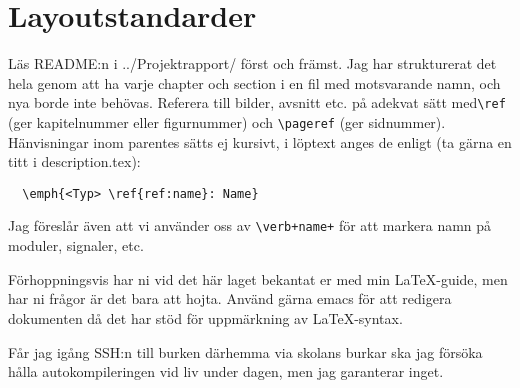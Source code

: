 \section{Layoutstandarder}
Läs README:n i ../Projektrapport/ först och främst. Jag har strukturerat det hela genom att ha varje chapter och section i en fil med motsvarande namn, och nya borde inte behövas. Referera till bilder, avsnitt etc. på adekvat sätt med\texttt{\textbackslash{}ref} (ger kapitelnummer eller figurnummer) och \texttt{\textbackslash{}pageref} (ger sidnummer).
Hänvisningar inom parentes sätts ej kursivt, i löptext anges de enligt (ta gärna en titt i description.tex):
\begin{verbatim}
  \emph{<Typ> \ref{ref:name}: Name}
\end{verbatim}

Jag föreslår även att vi använder oss av \verb#\verb+name+# för att markera namn på moduler, signaler, etc.

Förhoppningsvis har ni vid det här laget bekantat er med min \LaTeX{}-guide, men har ni frågor är det bara att hojta. Använd gärna emacs för att redigera dokumenten då det har stöd för uppmärkning av \LaTeX{}-syntax.

Får jag igång SSH:n till burken därhemma via skolans burkar ska jag försöka hålla autokompileringen vid liv under dagen, men jag garanterar inget.
